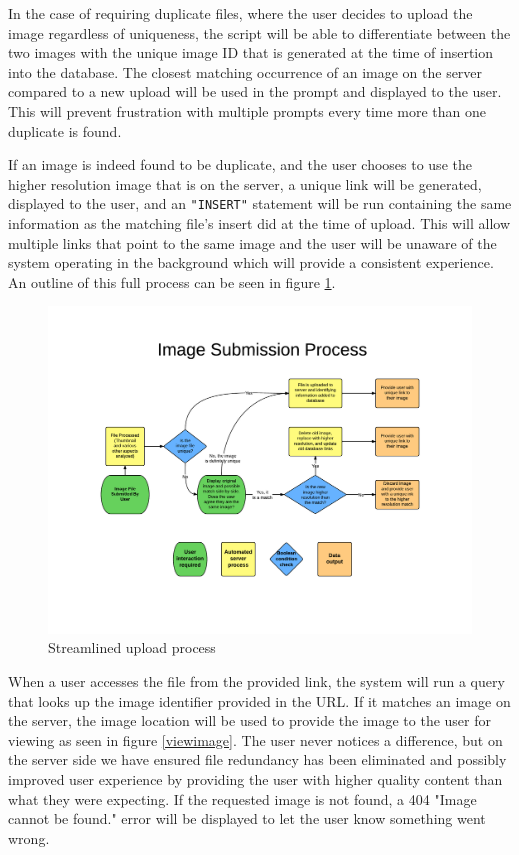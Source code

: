 \documentclass[11pt]{article}
\begin{document}
In the case of requiring duplicate files, where the user decides to upload the image regardless of uniqueness, the script will be able to differentiate between the two images with the unique image ID that is generated at the time of insertion into the database. The closest matching occurrence of an image on the server compared to a new upload will be used in the prompt and displayed to the user. This will prevent frustration with multiple prompts every time more than one duplicate is found.

If an image is indeed found to be duplicate, and the user chooses to use the higher resolution image that is on the server, a unique link will be generated, displayed to the user, and an {\tt "INSERT"} statement will be run containing the same information as the matching file's insert did at the time of upload. This will allow multiple links that point to the same image and the user will be unaware of the system operating in the background which will provide a consistent experience. An outline of this full process can be seen in figure \ref{method-fig1}.

\begin{figure}[htbp]
\centering
\includegraphics[trim={3cm 3.5cm 2cm 4.2cm},clip, width=6in]{upproc}
\caption{Streamlined upload process}
\label{method-fig1}
\end{figure}

When a user accesses the file from the provided link, the system will run a query that looks up the image identifier provided in the URL. If it matches an image on the server, the image location will be used to provide the image to the user for viewing as seen in figure \ref{viewimage}. The user never notices a difference, but on the server side we have ensured file redundancy has been eliminated and possibly improved user experience by providing the user with higher quality content than what they were expecting. If the requested image is not found, a 404 "Image cannot be found." error will be displayed to let the user know something went wrong.
\end{document}
